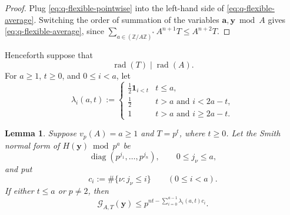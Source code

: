 \documentclass[a4paper,11pt, twoside,reqno]{amsart}
\theoremstyle{plain}
\newtheorem{lemma}[thm]{Lemma}
\theoremstyle{definition}
\theoremstyle{remark}
\newcommand{\bfa}{\bm{a}}
\newcommand{\bfy}{\bm{y}}
\newcommand{\ZZ}{\mathbb{Z}}
\renewcommand{\le}{\leqslant}
\renewcommand{\leq}{\leqslant}
\renewcommand{\ge}{\geqslant}
\renewcommand{\geq}{\geqslant}
\newcommand{\rad}{\operatorname{rad}}
\newcommand{\diag}{\operatorname{diag}}
\numberwithin{equation}{section}
\begin{document}
\begin{proof}
Plug \eqref{eq:q-flexible-pointwise} into
the left-hand side of \eqref{eq:q-flexible-average}.
Switching the order of summation of
the variables $\bfa,\bfy\bmod{A}$ gives \eqref{eq:q-flexible-average},
since $\sum_{a\in (\ZZ/A\ZZ)^\ast} A^{n+1} T \le A^{n+2} T$.
\end{proof}

Henceforth suppose that
\begin{equation}
\label{EQ:radTA}
\rad(T)\mid \rad(A).
\end{equation}
For \(a\geq1\),
\(t\geq0\),
and $0\le i<a$, let
\begin{equation}
\lambda_i(a,t) :=
\begin{cases}
\frac12\bm{1}_{i<t}&t\leq a,\\[1mm]
\frac12&t>a \text{ and } i<2a-t,\\
1&t>a \text{ and } i\geq 2a-t.
\end{cases}
\label{eq:q-penalty}
\end{equation}

\begin{lemma}
\label{lem:q-terminal}
Suppose $v_p(A) = a \ge 1$ and
$T = p^t$, where $t\ge 0$.
Let the Smith normal form of \(H(\bfy)\bmod p^a\) be
\[
\diag(p^{j_1},\ldots,p^{j_n}),\qquad
0\leq j_\nu\leq a,
\]
and put
\[
c_i:=\#\{\nu:j_\nu\leq i\}\qquad(0\leq i<a).
\]
If either $t\le a$ or $p\ne 2$, then
\begin{equation}
\mathcal G_{A,T}(\bfy)
\leq
p^{nt-\sum_{i=0}^{a-1}\lambda_i(a,t)c_i}.
\label{eq:q-terminal-profile}
\end{equation}
\end{lemma}
\end{document}
